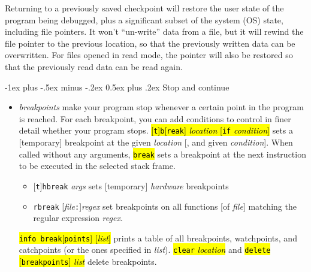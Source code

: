 \documentclass[a4paper,landscape]{article}
\makeatletter
\renewcommand{\section}{\@startsection{section}{1}{0mm}%
                                {-1ex plus -.5ex minus -.2ex}%
                                {0.5ex plus .2ex}%
                                {\normalfont\large\bfseries}}
\makeatother
\begin{document}
\begin{multicols*}{3}
Returning to a previously saved checkpoint will restore the user state of the program
being debugged, plus a significant subset of the system (OS) state, including file pointers. It
won't ``un-write'' data from a file, but it will rewind the file pointer to the previous location,
so that the previously written data can be overwritten. For files opened in read mode, the
pointer will also be restored so that the previously read data can be read again.

\section{Stop and continue}
\begin{itemize}
\item \emph{breakpoints} make your program stop whenever a certain point in the program is reached.  For each breakpoint, you can add conditions to control in finer detail whether your program stops.
\hl{[\texttt{t}]\texttt{b}[\texttt{reak}] \textit{location} [\texttt{if} \textit{condition}]} sets a [temporary] breakpoint at the given \textit{location} [, and given \textit{condition}]. When called without any arguments, \hl{\texttt{break}} sets a breakpoint at the next instruction to be executed in the selected stack frame.
	\begin{itemize}
	\item {}[\texttt{t}]\texttt{hbreak} \textit{args} sets [temporary] \emph{hardware} breakpoints
	\item \texttt{rbreak} [\textit{file}\texttt{:}]\textit{regex} set breakpoints on all functions [of \textit{file}] matching the regular expression \textit{regex}.
	\end{itemize}
\hl{\texttt{info break}[\texttt{points}] [\textit{list}]} prints a table of all breakpoints, watchpoints, and catchpoints (or the ones specified in \textit{list}).
\hl{\texttt{clear} \textit{location}} and \hl{\texttt{delete} [\texttt{breakpoints}] \textit{list}} delete breakpoints.


\end{itemize}
\end{multicols*}
\end{document}
